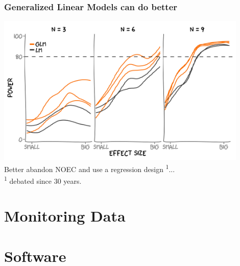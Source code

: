\documentclass[12pt, t, draft]{beamer}
\begin{document}
\begin{frame}
\frametitle{Generalized Linear Models can do better}
\center
\includegraphics[width = 0.9\textwidth]{fig/glm1.png} \\
\pause
\center
Better abandon NOEC and use a regression design \textsuperscript{1}...\\
\tiny \textsuperscript{1} debated since 30 years.
\end{frame}



\section{Monitoring Data}
\subsection{}




\section{Software}
\subsection{}
\end{document}

